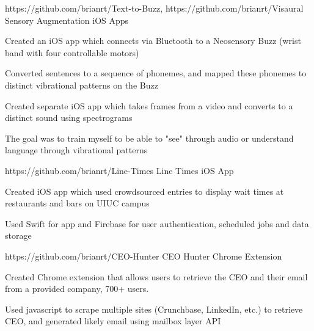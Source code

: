 

\begin{cventries}


  \cventry
    {https://github.com/brianrt/Text-to-Buzz, https://github.com/brianrt/Visaural} %
    {Sensory Augmentation iOS Apps} %
    {} %
    {} %
    {
      \begin{cvitems} %
        \item {Created an iOS app which connects via Bluetooth to a Neosensory Buzz (wrist band with four controllable motors)}
        \item {Converted sentences to a sequence of phonemes, and mapped these phonemes to distinct vibrational patterns on the Buzz}
        \item {Created separate iOS app which takes frames from a video and converts to a distinct sound using spectrograms}
        \item {The goal was to train myself to be able to "see" through audio or understand language through vibrational patterns}
      \end{cvitems}
    }

  \cventry
    {https://github.com/brianrt/Line-Times} %
    {Line Times iOS App} %
    {} %
    {} %
    {
      \begin{cvitems} %
        \item {Created iOS app which used crowdsourced entries to display wait times at restaurants and bars on UIUC campus}
        \item {Used Swift for app and Firebase for user authentication, scheduled jobs and data storage}
      \end{cvitems}
    }

  \cventry
    {https://github.com/brianrt/CEO-Hunter} %
    {CEO Hunter Chrome Extension} %
    {} %
    {} %
    {
      \begin{cvitems} %
        \item {Created Chrome extension that allows users to retrieve the CEO and their email from a provided company, 700+ users.}
        \item {Used javascript to scrape multiple sites (Crunchbase, LinkedIn, etc.) to retrieve CEO, and generated likely email using mailbox layer API}
      \end{cvitems}
    }

\end{cventries}
